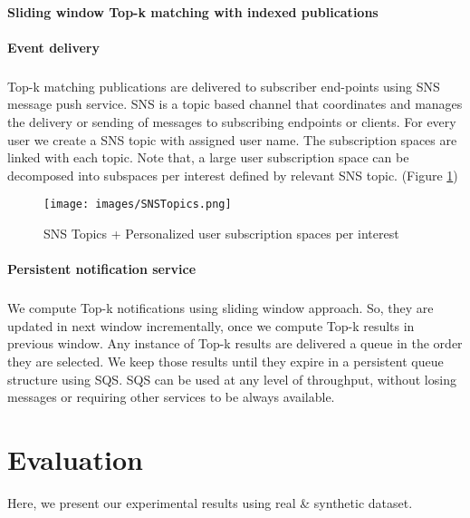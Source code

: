 \documentclass[a4paper,12pt,oneside]{book}
\theoremstyle{definition}
\theoremstyle{remark}
\begin{document}
\subsubsection{Sliding window Top-k matching with indexed publications}

\subsubsection{Event delivery}
\paragraph*{}
Top-k matching publications are delivered to subscriber end-points using \ac{SNS} message push service. \ac{SNS} is a topic based channel that coordinates and manages the delivery or sending of messages to subscribing endpoints or clients. For every user we create a \ac{SNS} topic with assigned user name. The subscription spaces are linked with each topic. Note that, a large user subscription space can be decomposed into subspaces per interest defined by relevant \ac{SNS} topic. (Figure \ref{img:snstopics})

\begin{figure}[h]
\begin{center}
\texttt{[image: images/SNSTopics.png]}
\caption{SNS Topics + Personalized user subscription spaces per interest}
\label{img:snstopics}
\end{center}
\end{figure}

\subsubsection{Persistent notification service}
\paragraph*{}
We compute Top-k notifications using sliding window approach. So, they are updated in next window incrementally, once we compute Top-k results in previous window. Any instance of Top-k results are delivered a queue in the order they are selected. We keep those results until they expire in a persistent queue structure using \ac{SQS}. SQS can be used at any level of throughput, without losing messages or requiring other services to be always available.


\chapter{Evaluation}
Here, we present our experimental results using real \& synthetic dataset.
\end{document}
